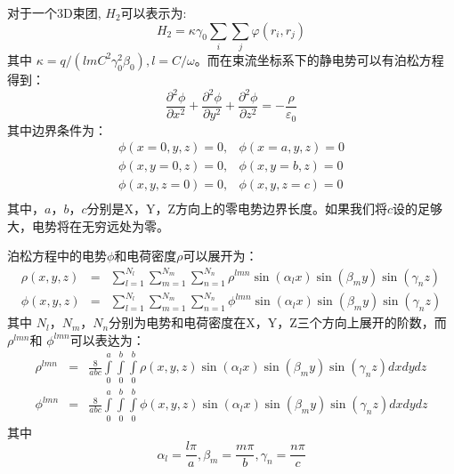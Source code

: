 对于一个3D束团, ${{H}_{2}}$可以表示为:
\begin{equation}
{{H}_{2}}=\kappa {{\gamma }_{0}}\sum\limits_{i}{\sum\limits_{j}{\varphi ({{r}_{i}},{{r}_{j}})}}
\end{equation}
其中 $\kappa =q/(lm{{C}^{2}}\gamma _{0}^{2}{{\beta }_{0}}),l=C/\omega $。而在束流坐标系下的静电势可以有泊松方程得到：
\begin{equation}
\frac{{{\partial }^{2}}\phi }{\partial {{x}^{2}}}+\frac{{{\partial }^{2}}\phi }{\partial {{y}^{2}}}+\frac{{{\partial }^{2}}\phi }{\partial {{z}^{2}}}=-\frac{\rho }{{{\varepsilon }_{0}}}
\end{equation}
其中边界条件为：
\begin{equation}
\begin{array}{cc}
   \phi (x=0,y,z)=0, & \phi (x=a,y,z)=0  \\
   \phi (x,y=0,z)=0, & \phi (x,y=b,z)=0  \\
   \phi (x,y,z=0)=0, & \phi (x,y,z=c)=0  \\
\end{array}
\end{equation}
其中，$a$，$b$，$c$分别是X，Y，Z方向上的零电势边界长度。如果我们将$c$设的足够大，电势将在无穷远处为零。

泊松方程中的电势$\phi$和电荷密度$\rho$可以展开为：
\begin{eqnarray}
 \rho(x,y,z)&=&\sum\limits_{l=1}^{{{N}_{l}}}{\sum\limits_{m=1}^{{{N}_{m}}}{\sum\limits_{n=1}^{{{N}_{n}}}{{{\rho }^{lmn}}\sin ({{\alpha }_{l}}x)\sin ({{\beta }_{m}}y)\sin ({{\gamma }_{n}}z)}}} \\
 \phi(x,y,z)&=&\sum\limits_{l=1}^{{{N}_{l}}}{\sum\limits_{m=1}^{{{N}_{m}}}{\sum\limits_{n=1}^{{{N}_{n}}}{{{\phi }^{lmn}}\sin ({{\alpha }_{l}}x)\sin ({{\beta }_{m}}y)\sin ({{\gamma }_{n}}z)}}}
\end{eqnarray}
其中 ${N}_{l}$，${N}_{m}$，${N}_{n}$分别为电势和电荷密度在X，Y，Z三个方向上展开的阶数，而 ${\rho }^{lmn}$和 ${\phi }^{lmn}$可以表达为：
\begin{eqnarray}
  {{\rho }^{lmn}}&=&\frac{8}{abc}\int\limits_{0}^{a}{\int\limits_{0}^{b}{\int\limits_{0}^{b}{\rho (x,y,z)\sin ({{\alpha }_{l}}x)\sin ({{\beta }_{m}}y)\sin ({{\gamma }_{n}}z)dxdydz}}} \\
 {{\phi }^{lmn}}&=&\frac{8}{abc}\int\limits_{0}^{a}{\int\limits_{0}^{b}{\int\limits_{0}^{b}{\phi (x,y,z)\sin ({{\alpha }_{l}}x)\sin ({{\beta }_{m}}y)\sin ({{\gamma }_{n}}z)dxdydz}}}
\end{eqnarray}
其中
\begin{equation}
{{\alpha }_{l}}=\frac{l\pi }{a},{{\beta }_{m}}=\frac{m\pi }{b},{{\gamma }_{n}}=\frac{n\pi }{c}
\end{equation}

